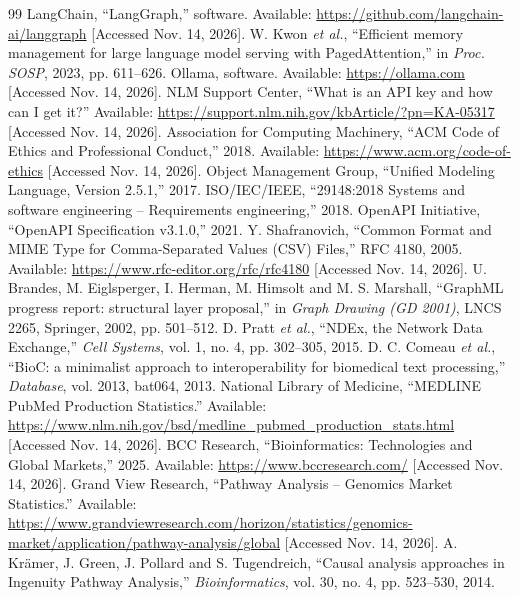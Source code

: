 \documentclass[11pt,a4paper]{article}
\begin{document}
\begin{thebibliography}{99}
 LangChain, ``LangGraph,'' software.
  Available: \url{https://github.com/langchain-ai/langgraph} [Accessed Nov. 14, 2026].
 W. Kwon \emph{et al.}, ``Efficient memory management for large language model
  serving with PagedAttention,'' in \emph{Proc. SOSP}, 2023, pp. 611--626.
 Ollama, software. Available: \url{https://ollama.com} [Accessed Nov. 14, 2026].
 NLM Support Center, ``What is an API key and how can I get it?''
  Available: \url{https://support.nlm.nih.gov/kbArticle/?pn=KA-05317} [Accessed Nov. 14, 2026].
 Association for Computing Machinery, ``ACM Code of Ethics and Professional
  Conduct,'' 2018. Available: \url{https://www.acm.org/code-of-ethics} [Accessed Nov. 14, 2026].
 Object Management Group, ``Unified Modeling Language, Version 2.5.1,'' 2017.
 ISO/IEC/IEEE, ``29148:2018 Systems and software engineering -- Requirements
  engineering,'' 2018.
 OpenAPI Initiative, ``OpenAPI Specification v3.1.0,'' 2021.
 Y. Shafranovich, ``Common Format and MIME Type for Comma-Separated Values
  (CSV) Files,'' RFC 4180, 2005. Available: \url{https://www.rfc-editor.org/rfc/rfc4180} [Accessed Nov. 14, 2026].
 U. Brandes, M. Eiglsperger, I. Herman, M. Himsolt and M. S. Marshall, ``GraphML
  progress report: structural layer proposal,'' in \emph{Graph Drawing (GD 2001)}, LNCS 2265,
  Springer, 2002, pp. 501--512.
 D. Pratt \emph{et al.}, ``NDEx, the Network Data Exchange,'' \emph{Cell Systems},
  vol. 1, no. 4, pp. 302--305, 2015.
 D. C. Comeau \emph{et al.}, ``BioC: a minimalist approach to interoperability for
  biomedical text processing,'' \emph{Database}, vol. 2013, bat064, 2013.
 National Library of Medicine, ``MEDLINE PubMed Production Statistics.''
  Available: \url{https://www.nlm.nih.gov/bsd/medline_pubmed_production_stats.html} [Accessed Nov. 14, 2026].
 BCC Research, ``Bioinformatics: Technologies and Global Markets,'' 2025.
  Available: \url{https://www.bccresearch.com/} [Accessed Nov. 14, 2026].
 Grand View Research, ``Pathway Analysis -- Genomics Market Statistics.''
  Available:
  \url{https://www.grandviewresearch.com/horizon/statistics/genomics-market/application/pathway-analysis/global} [Accessed Nov. 14, 2026].
 A. Kr\"amer, J. Green, J. Pollard and S. Tugendreich, ``Causal analysis approaches
  in Ingenuity Pathway Analysis,'' \emph{Bioinformatics}, vol. 30, no. 4, pp. 523--530, 2014.

\end{thebibliography}
\end{document}
